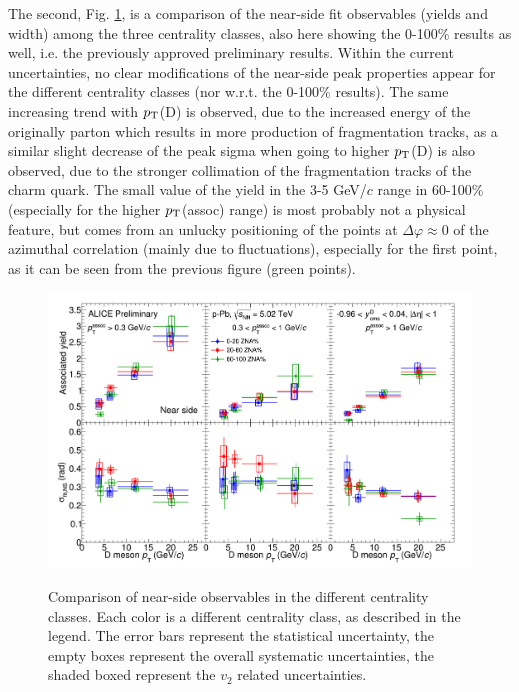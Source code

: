 The second, Fig. \ref{fig:prel2}, is a comparison of the near-side fit observables (yields and width) among the three centrality classes, also here showing the 0-100\% results as well, i.e. the previously approved preliminary results. Within the current uncertainties, no clear modifications of the near-side peak properties appear for the different centrality classes (nor w.r.t. the 0-100\% results). The same increasing trend with $p_{\rm T}$(D) is observed, due to the increased energy of the originally parton which results in more production of fragmentation tracks, as a similar slight decrease of the peak sigma when going to higher $p_{\rm T}$(D) is also observed, due to the stronger collimation of the fragmentation tracks of the charm quark. The small value of the yield in the 3-5 GeV/$c$ range in 60-100\% (especially for the higher $p_{\rm T}$(assoc) range) is most probably not a physical feature, but comes from an unlucky positioning of the points at $\Delta\varphi \approx 0$ of the azimuthal correlation (mainly due to fluctuations), especially for the first point, as it can be seen from the previous figure (green points).

\begin{landscape}
\begin{figure}
\centering
{\includegraphics[width=0.95\linewidth]{figuresVsCent/Averages/Trends/ComparePPbVsCentFitResults_FinalQM.png}}
 \caption{Comparison of near-side observables in the different centrality classes. Each color is a different centrality class, as described in the legend. The error bars represent the statistical uncertainty, the empty boxes represent the overall systematic uncertainties, the shaded boxed represent the $v_2$ related uncertainties.}
\label{fig:prel2}
\end{figure}
\end{landscape}

